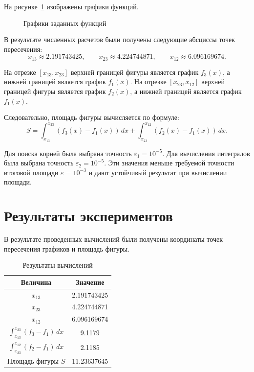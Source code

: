 \documentclass[a4paper,12pt,titlepage,final]{article}
\begin{document}
На рисунке~\ref{plot1} изображены графики функций.

\begin{figure}[h]
\centering
{}
\caption{Графики заданных функций}
\label{plot1}
\end{figure}

В результате численных расчетов были получены следующие абсциссы точек пересечения:
\[
    x_{13}\approx 2.191743425,\qquad
    x_{23}\approx 4.224744871,\qquad
    x_{12}\approx 6.096169674.
\]

На отрезке $[x_{13},x_{23}]$ верхней границей фигуры является график $f_3(x)$, а нижней границей является график $f_1(x)$. На отрезке $[x_{23},x_{12}]$ верхней границей фигуры является график $f_2(x)$, а нижней границей является график $f_1(x)$.

Следовательно, площадь фигуры вычисляется по формуле:
\[
S=
\int_{x_{13}}^{x_{23}}\left(f_3(x)-f_1(x)\right)\,dx+
\int_{x_{23}}^{x_{12}}\left(f_2(x)-f_1(x)\right)\,dx.
\]

Для поиска корней была выбрана точность $\varepsilon_1=10^{-5}$. Для вычисления интегралов была выбрана точность $\varepsilon_2=10^{-5}$. Эти значения меньше требуемой точности итоговой площади $\varepsilon=10^{-3}$ и дают устойчивый результат при вычислении площади.

\newpage

\section{Результаты экспериментов}

В результате проведенных вычислений были получены координаты точек пересечения графиков и площадь фигуры.

\begin{table}[h]
\centering
\begin{tabular}{|c|c|}
\hline
Величина & Значение \\
\hline
$x_{13}$ & 2.191743425 \\
\hline
$x_{23}$ & 4.224744871 \\
\hline
$x_{12}$ & 6.096169674 \\
\hline
$\displaystyle\int_{x_{13}}^{x_{23}}(f_3-f_1)\,dx$ & 9.1179 \\
\hline
$\displaystyle\int_{x_{23}}^{x_{12}}(f_2-f_1)\,dx$ & 2.1185 \\
\hline
Площадь фигуры $S$ & 11.23637645 \\
\hline
\end{tabular}
\caption{Результаты вычислений}
\label{table1}
\end{table}
\end{document}
